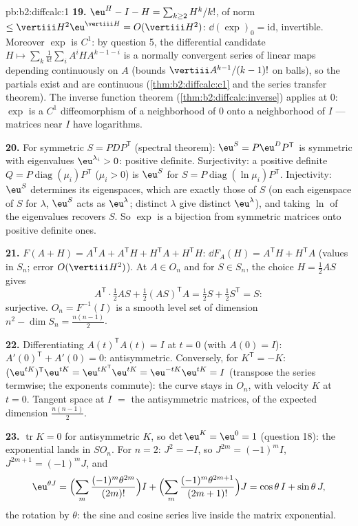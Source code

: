 \begin{solution}{pb:b2:diffcalc:1}
\textbf{19.} $\eu^H - I - H = \sum_{k\geq2}H^k/k!$, of norm
$\leq \vertiii H^2\eu^{\vertiii H} = O(\vertiii H^2)$:
$\dd(\exp)_0 = \mathrm{id}$, invertible. Moreover $\exp$ is
$C^1$: by question 5, the differential candidate $H \mapsto
\sum_k\frac1{k!}\sum_iA^iHA^{k-1-i}$ is a normally convergent
series of linear maps depending continuously on $A$ (bounds
$\vertiii A^{k-1}/(k-1)!$ on balls), so the partials exist and
are continuous (\cref{thm:b2:diffcalc:c1} and the series
transfer theorem). The inverse function theorem
(\cref{thm:b2:diffcalc:inverse}) applies at $0$: $\exp$ is a
$C^1$ diffeomorphism of a neighborhood of $0$ onto a
neighborhood of $I$ --- matrices near $I$ have logarithms.

\textbf{20.} For symmetric $S = PDP^{\mathsf T}$ (spectral
theorem): $\eu^S = P\eu^DP^{\mathsf T}$ is symmetric with
eigenvalues $\eu^{\lambda_i} > 0$: positive definite.
Surjectivity: a positive definite $Q =
P\operatorname{diag}(\mu_i)P^{\mathsf T}$ ($\mu_i > 0$) is
$\eu^S$ for $S = P\operatorname{diag}(\ln\mu_i)P^{\mathsf T}$.
Injectivity: $\eu^S$ determines its eigenspaces, which are
exactly those of $S$ (on each eigenspace of $S$ for $\lambda$,
$\eu^S$ acts as $\eu^\lambda$; distinct $\lambda$ give
distinct $\eu^\lambda$), and taking $\ln$ of the eigenvalues
recovers $S$. So $\exp$ is a bijection from symmetric matrices
onto positive definite ones.

\textbf{21.} $F(A + H) = A^{\mathsf T}A + A^{\mathsf T}H +
H^{\mathsf T}A + H^{\mathsf T}H$: $\dd F_A(H) =
A^{\mathsf T}H + H^{\mathsf T}A$ (values in $S_n$; error
$O(\vertiii H^2)$). At $A \in O_n$ and for $S \in S_n$, the
choice $H = \frac12AS$ gives
\[
A^{\mathsf T}\cdot\tfrac12AS + \tfrac12(AS)^{\mathsf T}A
= \tfrac12 S + \tfrac12 S^{\mathsf T} = S :
\]
surjective. $O_n = F^{-1}(I)$ is a smooth level set of
dimension $n^2 - \dim S_n = \frac{n(n-1)}2$.

\textbf{22.} Differentiating $A(t)^{\mathsf T}A(t) = I$ at $t
= 0$ (with $A(0) = I$): $A'(0)^{\mathsf T} + A'(0) = 0$:
antisymmetric. Conversely, for $K^{\mathsf T} = -K$:
$(\eu^{tK})^{\mathsf T}\eu^{tK} = \eu^{tK^{\mathsf T}}
\eu^{tK} = \eu^{-tK}\eu^{tK} = I$ (transpose the series
termwise; the exponents commute): the curve stays in $O_n$,
with velocity $K$ at $t = 0$. Tangent space at $I$ $=$ the
antisymmetric matrices, of the expected dimension
$\frac{n(n-1)}2$.

\textbf{23.} $\operatorname{tr}K = 0$ for antisymmetric $K$,
so $\det\eu^K = \eu^0 = 1$ (question 18): the exponential
lands in $SO_n$. For $n = 2$: $J^2 = -I$, so $J^{2m} =
(-1)^mI$, $J^{2m+1} = (-1)^mJ$, and
\[
\eu^{\theta J}
= \Bigl(\sum_m\frac{(-1)^m\theta^{2m}}{(2m)!}\Bigr)I
+ \Bigl(\sum_m\frac{(-1)^m\theta^{2m+1}}{(2m+1)!}\Bigr)J
= \cos\theta\,I + \sin\theta\,J ,
\]
the rotation by $\theta$: the sine and cosine series live
inside the matrix exponential.


\end{solution}
